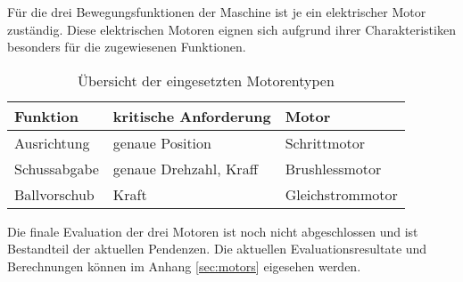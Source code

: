 
Für die drei Bewegungsfunktionen der Maschine ist je ein elektrischer
Motor zuständig. Diese elektrischen Motoren eignen sich aufgrund ihrer
Charakteristiken besonders für die zugewiesenen Funktionen. 

\begin{table}[h!]
	\centering
	\begin{tabular}{l l l}
		Funktion & kritische Anforderung & Motor \\
		\hline
		Ausrichtung
			& genaue Position
			& Schrittmotor \\
		Schussabgabe
			& genaue Drehzahl, Kraff
			& Brushlessmotor \\
		Ballvorschub
			& Kraft
			& Gleichstrommotor \\
	\end{tabular}
	\caption{Übersicht der eingesetzten Motorentypen}
\end{table}

Die finale Evaluation der drei Motoren ist noch nicht abgeschlossen
und ist Bestandteil der aktuellen Pendenzen. Die aktuellen
Evaluationsresultate und Berechnungen können im Anhang \ref{sec:motors}
eigesehen werden.
